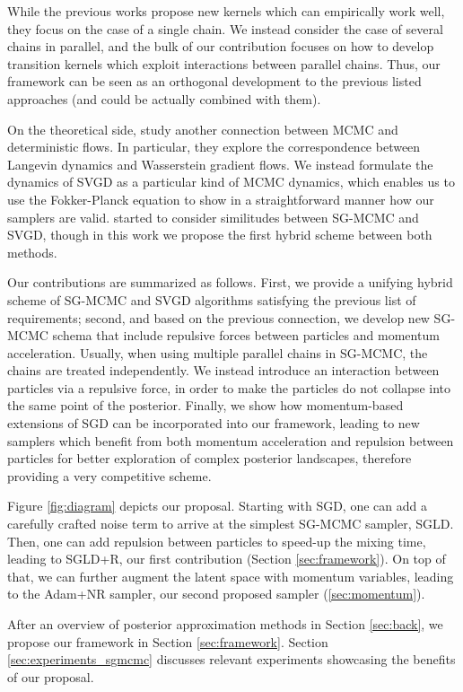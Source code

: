 While the previous works propose new kernels which can empirically work well, they focus on the case of a single chain. We instead consider the case of several chains in parallel, and the bulk of our contribution focuses on how to develop transition kernels which exploit interactions between parallel chains. Thus, our framework can be seen as an orthogonal development to the previous listed approaches (and could be actually combined with them).

On the theoretical side, \cite{chen2018unified} study another connection between MCMC and deterministic flows. In particular, they explore the correspondence between Langevin dynamics and Wasserstein gradient flows.
We instead formulate the dynamics of SVGD as a particular kind of MCMC dynamics, which enables us to use the Fokker-Planck equation to show in a straightforward manner how our samplers are valid. \cite{liu2017stein} started to consider similitudes between SG-MCMC and SVGD, though in this work we propose the first hybrid scheme between both methods.



Our contributions are summarized as follows. First, we provide a unifying hybrid scheme of SG-MCMC and SVGD algorithms satisfying the previous list of requirements; second, and based on the previous connection, 
we develop new SG-MCMC schema that include repulsive forces between particles and momentum acceleration. Usually, when using multiple parallel chains in SG-MCMC, the chains are treated independently. We instead introduce an interaction between particles via a repulsive force, in order to make the particles do not collapse into the same point of the posterior.
Finally, we show how momentum-based extensions of SGD can be incorporated into our framework, leading to new samplers which benefit from both momentum acceleration and repulsion between particles for better exploration of complex posterior landscapes, therefore providing a very competitive scheme. 

Figure \ref{fig:diagram} depicts our proposal. Starting with SGD, one can add a carefully crafted noise term to arrive at the simplest SG-MCMC sampler, SGLD. Then, one can add repulsion between particles to speed-up the mixing time, leading to SGLD+R, our first contribution (Section \ref{sec:framework}). On top of that, we can further augment the latent space with momentum variables, leading to the Adam+NR sampler, our second proposed sampler (\ref{sec:momentum}).

After an overview of posterior approximation methods in Section \ref{sec:back}, we propose our framework in Section \ref{sec:framework}.
Section \ref{sec:experiments_sgmcmc} discusses relevant experiments showcasing the benefits of our proposal. %


